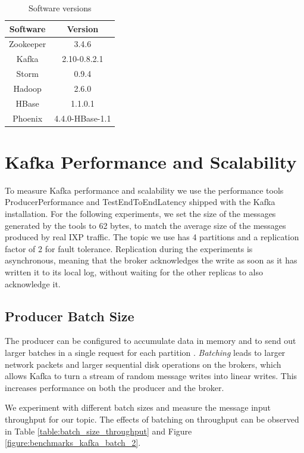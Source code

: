 \begin{table}[h!]
\centering
\begin{tabular}{ |c|c| }
\hline
Software & Version \\ \hline \hline
Zookeeper & 3.4.6 \\ \hline
Kafka & 2.10-0.8.2.1 \\ \hline
Storm & 0.9.4 \\ \hline
Hadoop & 2.6.0 \\ \hline
HBase & 1.1.0.1 \\ \hline
Phoenix & 4.4.0-HBase-1.1 \\ \hline
\end{tabular}
\caption{Software versions}
\label{table:benchmarks_cluster_sw_specs}
\end{table}


\section{Kafka Performance and Scalability}

To measure Kafka performance and scalability we use the performance tools ProducerPerformance and TestEndToEndLatency shipped with the Kafka installation. For the following experiments, we set the size of the messages generated by the tools to 62 bytes, to match the average size of the messages produced by real IXP traffic. The topic we use has 4 partitions and a replication factor of 2 for fault tolerance. Replication during the experiments is asynchronous, meaning that the broker acknowledges the write as soon as it has written it to its local log, without waiting for the other replicas to also acknowledge it.

\subsection{Producer Batch Size}\label{subsection:benchmarks_kafka_batch}

The producer can be configured to accumulate data in memory and to send out larger batches in a single request for each partition \cite{kafka_documentation}. \emph{Batching} leads to larger network packets and larger sequential disk operations on the brokers, which allows Kafka to turn a stream of random message writes into linear writes. This increases performance on both the producer and the broker. 

We experiment with different batch sizes and measure the message input throughput for our topic. The effects of batching on throughput can be observed in Table \ref{table:batch_size_throughput} and Figure \ref{figure:benchmarks_kafka_batch_2}.

